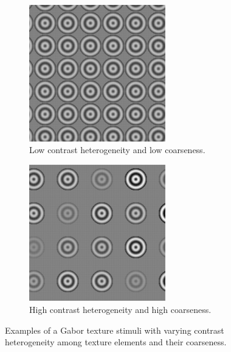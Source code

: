 \begin{figure}[!htp]
    \centering
    \begin{subfigure}[t]{0.3\textwidth}
        \centering
        \includegraphics[width=0.65\textwidth]{src/assets/images/25patches/dist-1.0000___contrast-0.0100.png}
        \caption{Low contrast heterogeneity and low coarseness.}
    \end{subfigure}
    \hspace{0.03\textwidth}
    \begin{subfigure}[t]{0.3\textwidth}
        \centering
        \includegraphics[width=0.65\textwidth]{src/assets/images/25patches/dist-1.5000___contrast-1.0000.png}
        \caption{High contrast heterogeneity and high coarseness.}
    \end{subfigure}
    \caption[Gabor stimuli examples]{Examples of a Gabor texture stimuli with varying contrast heterogeneity among texture elements and their coarseness.}
    \label{fig:gabor-contrast-example}
\end{figure}


